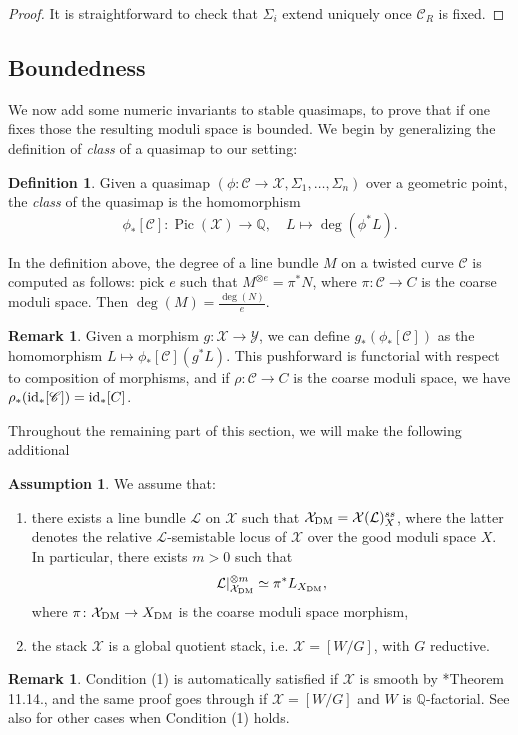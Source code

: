 \documentclass{amsart}
\newcommand{\bQ}{\mathbb{Q}}
\newcommand{\sC}{\mathscr{C}}
\newcommand{\cL}{\mathcal{L}}
\newcommand{\cX}{\mathcal{X}}
\newcommand{\cY}{\mathcal{Y}}
\newcommand{\Pic}{\operatorname{Pic}}
\newcommand{\dm}{{\rm DM}}
\theoremstyle{definition}
\newtheorem{Assumptions}[theorem]{Assumption}
\newtheorem{Def}[theorem]{Definition}
\newtheorem{Remark}[theorem]{Remark}
\theoremstyle{definition}
\begin{document}
{\begin{proof}
     It is straightforward to check that $\Sigma_i$ extend uniquely once $\sC_R$ is fixed.
\end{proof}
\subsection{Boundedness}\label{section_boundedness_qmaps}
We now add some numeric invariants to stable quasimaps, to prove that if one fixes those the resulting moduli space is bounded.
We begin by generalizing the definition of \textit{class} of a quasimap to our setting:
\begin{Def}\label{def_beta}
    Given a quasimap $(\phi\colon \sC \to \cX,\Sigma_1,\ldots,\Sigma_n)$ over a geometric point, the \emph{class} of the quasimap is the homomorphism
    \[\phi_*[\sC] \colon \Pic(\cX) \longrightarrow \bQ,\quad L \longmapsto \deg(\phi^*L).\]
\end{Def}
In the definition above, the degree of a line bundle $M$ on a twisted curve $\sC$ is computed as follows: pick $e$ such that $M^{\otimes e}=\pi^*N$, where $\pi:\sC\to C$ is the coarse moduli space. Then $\deg(M)=\frac{\deg(N)}{e}$.
\begin{Remark}
    Given a morphism $g:\cX \to \cY$, we can define $g_*(\phi_*[\sC])$ as the homomorphism $L\longmapsto \phi_*[\sC](g^*L)$. This pushforward is functorial with respect to composition of morphisms, and if $\rho:\sC\to C$ is the coarse moduli space, we have $\rho_*({\rm id}_*[\sC])={\rm id}_*[C]$.
\end{Remark}

Throughout the remaining part of this section, we will make the following additional
\begin{Assumptions}\label{assumptions:extension of line bundle}
We assume that:
    \begin{enumerate}
        \item there exists a line bundle $\cL$ on $\cX$ such that $\cX_\dm = \cX(\cL)^{ss}_X$, where the latter denotes the relative $\cL$-semistable locus of $\cX$ over the good moduli space $X$. In particular, there exists $m>0$ such that
    \[ \cL|_{\cX_\dm}^{\otimes m} \simeq \pi^*L_{X_\dm}, \]
    where $\pi\colon \cX_{\dm} \to X_\dm $ is the coarse moduli space morphism,
    \item the stack $\cX$ is a global quotient stack, i.e. $\cX=[W/G]$, with $G$ reductive.
    \end{enumerate}
\end{Assumptions}
\begin{Remark}\label{rmk_if_W_is_Qfactorial_then_any_open_is_the_ss_locus_of_a_linebundle}
    Condition (1) is automatically satisfied if $\cX$ is smooth by \cite{Alp}*{Theorem 11.14.}, and the same proof goes through if $\cX=[W/G]$ and $W$ is $\bQ$-factorial. See also  for other cases when Condition (1) holds.
\end{Remark}


}
\end{document}
